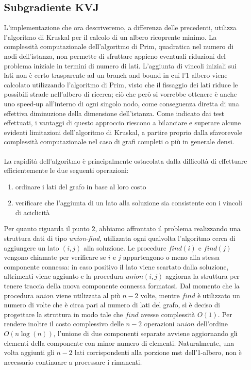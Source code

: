 \subsection{Subgradiente KVJ}
L'implementazione che ora descriveremo, a differenza delle precedenti, utilizza l'algoritmo di Kruskal per il calcolo di un albero ricoprente minimo. La complessità computazionale dell'algoritmo di Prim, quadratica nel numero di nodi dell'istanza, non permette di sfruttare appieno eventuali riduzioni del problema iniziale in termini di numero di lati. L'aggiunta di vincoli iniziali sui lati non è certo trasparente ad un branch-and-bound in cui l'1-albero viene calcolato utilizzando l'algoritmo di Prim, visto che il fissaggio dei lati riduce le possibili strade nell'albero di ricerca; ciò che però si vorrebbe ottenere è anche uno speed-up all'interno di ogni singolo nodo, come conseguenza diretta di una effettiva diminuzione della dimensione dell'istanza. Come indicato dai test effettuati, i vantaggi di questo approccio riescono a bilanciare e superare alcune evidenti limitazioni dell'algoritmo di Kruskal, a partire proprio dalla sfavorevole complessità computazionale nel caso di grafi completi o più in generale densi.
\paragraph*{}
La rapidità dell'algoritmo è principalmente ostacolata dalla difficoltà di effettuare efficientemente le due seguenti operazioni:
\begin{enumerate}[noitemsep]
\item ordinare i lati del grafo in base al loro costo
\item verificare che l'aggiunta di un lato alla soluzione sia consistente con i vincoli di aciclicità
\end{enumerate}
Per quanto riguarda il punto $2$, abbiamo affrontato il problema realizzando una struttura dati di tipo \emph{union-find}, utilizzata ogni qualvolta l'algoritmo cerca di aggiungere un lato $(i, j)$ alla soluzione. Le procedure $find(i)$ e $find(j)$ vengono chiamate per verificare se $i$ e $j$ appartengono o meno alla stessa componente connessa: in caso positivo il lato viene scartato dalla soluzione, altrimenti viene aggiunto e la procedura $union(i, j)$ aggiorna la struttura per tenere traccia della nuova componente connessa formatasi. Dal momento che la procedura $union$ viene utilizzata al più  $n-2$ volte, mentre $find$ è utilizzato un numero di volte che è circa pari al numero di lati del grafo, sì è deciso di progettare la struttura in modo tale che $find$ avesse complessità $O(1)$. Per rendere inoltre il costo complessivo delle $n-2$ operazioni $union$ dell'ordine $O(n\log(n))$, l'unione di due componenti separate avviene aggiornando gli elementi della componente con minor numero di elementi. Naturalmente, una volta aggiunti gli $n-2$ lati corrispondenti alla porzione mst dell'1-albero, non è necessario continuare a processare i rimanenti.

